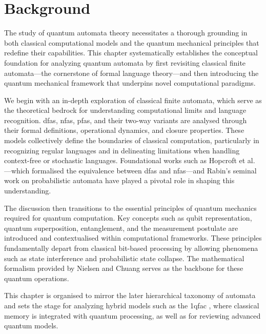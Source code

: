 \chapter{Background}  
\label{chap:background}

The study of quantum automata theory necessitates a thorough grounding in both classical computational models and the quantum mechanical principles that redefine their capabilities. This chapter systematically establishes the conceptual foundation for analyzing quantum automata by first revisiting classical finite automata—the cornerstone of formal language theory—and then introducing the quantum mechanical framework that underpins novel computational paradigms.

We begin with an in-depth exploration of classical finite automata, which serve as the theoretical bedrock for understanding computational limits and language recognition. \glspl{dfa}, \glspl{nfa}, \glspl{pfa}, and their two-way variants are analysed through their formal definitions, operational dynamics, and closure properties. These models collectively define the boundaries of classical computation, particularly in recognizing regular languages and in delineating limitations when handling context-free or stochastic languages. Foundational works such as Hopcroft et al. \cite{hopcroft2006introduction, sipser2012introduction}—which formalised the equivalence between \glspl{dfa} and \glspl{nfa}—and Rabin's seminal work on probabilistic automata \cite{rabin1963probabilistic} have played a pivotal role in shaping this understanding.

The discussion then transitions to the essential principles of quantum mechanics required for quantum computation. Key concepts such as qubit representation, quantum superposition, entanglement, and the measurement postulate are introduced and contextualised within computational frameworks. These principles fundamentally depart from classical bit-based processing by allowing phenomena such as state interference and probabilistic state collapse. The mathematical formalism provided by Nielsen and Chuang \cite{nielsen2010quantum} serves as the backbone for these quantum operations.

This chapter is organised to mirror the later hierarchical taxonomy of automata and sets the stage for analyzing hybrid models such as the \gls{1qfac} \cite{zheng2012one}, where classical memory is integrated with quantum processing, as well as for reviewing advanced quantum models.



